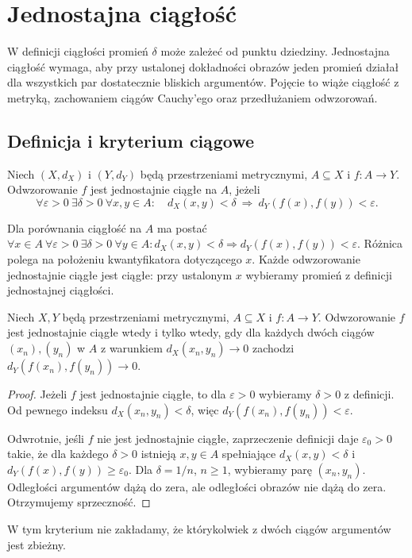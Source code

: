 \chapter{Jednostajna ciągłość}
\label{ma1:ch:uniform-continuity}

W definicji ciągłości promień $\delta$ może zależeć od punktu dziedziny. Jednostajna ciągłość wymaga, aby przy ustalonej dokładności obrazów jeden promień działał dla wszystkich par dostatecznie bliskich argumentów. Pojęcie to wiąże ciągłość z metryką, zachowaniem ciągów Cauchy'ego oraz przedłużaniem odwzorowań.

\section{Definicja i kryterium ciągowe}
\begin{definicja}
\label{ma1:def:uniform-continuity}
Niech $(X,d_X)$ i $(Y,d_Y)$ będą przestrzeniami metrycznymi, $A\subseteq X$ i $f:A\to Y$. Odwzorowanie $f$ jest jednostajnie ciągłe na $A$, jeżeli
\[
 \forall\varepsilon>0\ \exists\delta>0\ \forall x,y\in A:
 \quad d_X(x,y)<\delta\ \Longrightarrow\ d_Y(f(x),f(y))<\varepsilon.
\]
\end{definicja}
Dla porównania ciągłość na $A$ ma postać
$\forall x\in A\ \forall\varepsilon>0\ \exists\delta>0\ \forall y\in A:
d_X(x,y)<\delta\Rightarrow d_Y(f(x),f(y))<\varepsilon$.
Różnica polega na położeniu kwantyfikatora dotyczącego $x$. Każde odwzorowanie jednostajnie ciągłe jest ciągłe: przy ustalonym $x$ wybieramy promień z definicji jednostajnej ciągłości.

\begin{twierdzenie}
\label{ma1:thm:uniform-sequential}
Niech $X,Y$ będą przestrzeniami metrycznymi, $A\subseteq X$ i $f:A\to Y$. Odwzorowanie $f$ jest jednostajnie ciągłe wtedy i tylko wtedy, gdy dla każdych dwóch ciągów $(x_n),(y_n)$ w $A$ z warunkiem $d_X(x_n,y_n)\to0$ zachodzi $d_Y(f(x_n),f(y_n))\to0$.
\end{twierdzenie}
\begin{proof}
Jeżeli $f$ jest jednostajnie ciągłe, to dla $\varepsilon>0$ wybieramy $\delta>0$ z definicji. Od pewnego indeksu $d_X(x_n,y_n)<\delta$, więc $d_Y(f(x_n),f(y_n))<\varepsilon$.

Odwrotnie, jeśli $f$ nie jest jednostajnie ciągłe, zaprzeczenie definicji daje $\varepsilon_0>0$ takie, że dla każdego $\delta>0$ istnieją $x,y\in A$ spełniające $d_X(x,y)<\delta$ i $d_Y(f(x),f(y))\ge\varepsilon_0$. Dla $\delta=1/n$, $n\ge1$, wybieramy parę $(x_n,y_n)$. Odległości argumentów dążą do zera, ale odległości obrazów nie dążą do zera. Otrzymujemy sprzeczność.
\end{proof}
W tym kryterium nie zakładamy, że którykolwiek z dwóch ciągów argumentów jest zbieżny.

